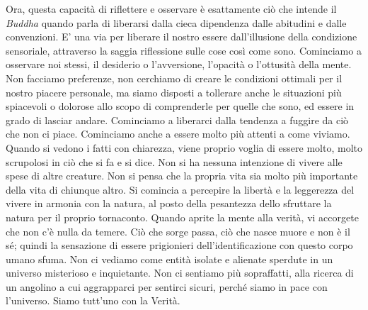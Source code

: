 Ora, questa capacità di riflettere e osservare è esattamente ciò che
intende il \textit{Buddha} quando parla di liberarsi dalla cieca dipendenza dalle
abitudini e dalle convenzioni. E' una via per liberare il nostro essere
dall'illusione della condizione sensoriale, attraverso la saggia
riflessione sulle cose così come sono. Cominciamo a osservare noi
stessi, il desiderio o l'avversione, l'opacità o l'ottusità della mente.
Non facciamo preferenze, non cerchiamo di creare le condizioni ottimali
per il nostro piacere personale, ma siamo disposti a tollerare anche le
situazioni più spiacevoli o dolorose allo scopo di comprenderle per
quelle che sono, ed essere in grado di lasciar andare. Cominciamo a
liberarci dalla tendenza a fuggire da ciò che non ci piace. Cominciamo
anche a essere molto più attenti a come viviamo. Quando si vedono i
fatti con chiarezza, viene proprio voglia di essere molto, molto
scrupolosi in ciò che si fa e si dice. Non si ha nessuna intenzione di
vivere alle spese di altre creature. Non si pensa che la propria vita
sia molto più importante della vita di chiunque altro. Si comincia a
percepire la libertà e la leggerezza del vivere in armonia con la
natura, al posto della pesantezza dello sfruttare la natura per il
proprio tornaconto. Quando aprite la mente alla verità, vi accorgete che
non c'è nulla da temere. Ciò che sorge passa, ciò che nasce muore e non
è il sé; quindi la sensazione di essere prigionieri dell'identificazione
con questo corpo umano sfuma. Non ci vediamo come entità isolate e
alienate sperdute in un universo misterioso e inquietante. Non ci
sentiamo più sopraffatti, alla ricerca di un angolino a cui aggrapparci
per sentirci sicuri, perché siamo in pace con l'universo. Siamo tutt'uno
con la Verità.


